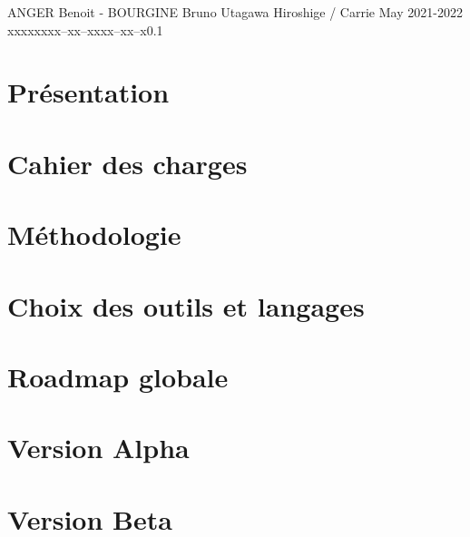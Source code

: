 \documentclass{tstextbook}
\begin{document}
       {ANGER Benoit - BOURGINE Bruno}
       {Utagawa Hiroshige / Carrie May}
       {2021-2022}
       {xxxxx}{xxx--xx--xxxx--xx--x}{0.1}
       {}
       {}



\chapter{Présentation}


\chapter{Cahier des charges}


\chapter{Méthodologie}


\chapter{Choix des outils et langages}



\chapter{Roadmap globale}


\chapter{Version Alpha}



\chapter{Version Beta}



% 

\end{document}
